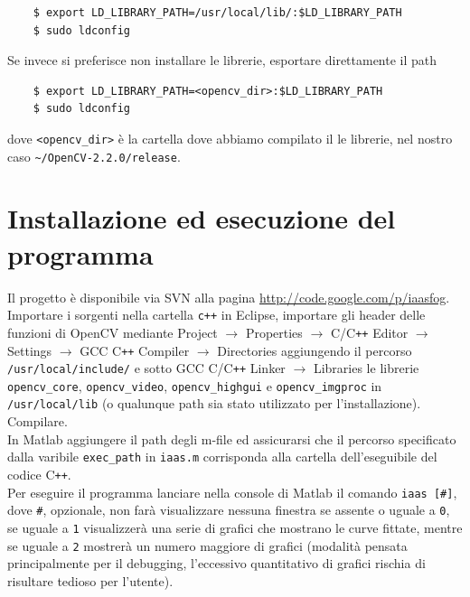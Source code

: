 \documentclass[12pt]{report}
\begin{document}
\begin{verbatim}
	$ export LD_LIBRARY_PATH=/usr/local/lib/:$LD_LIBRARY_PATH
	$ sudo ldconfig
\end{verbatim}

\noindent Se invece si preferisce non installare le librerie, esportare direttamente il path 

\begin{verbatim}
	$ export LD_LIBRARY_PATH=<opencv_dir>:$LD_LIBRARY_PATH
	$ sudo ldconfig
\end{verbatim}

\noindent dove \verb|<opencv_dir>| \`e la cartella dove abbiamo compilato il le librerie, nel nostro caso \verb|~/OpenCV-2.2.0/release|.

\section{Installazione ed esecuzione del programma}
\noindent Il progetto \`e disponibile via SVN alla pagina \url{http://code.google.com/p/iaasfog}.\\
Importare i sorgenti nella cartella \verb|c++| in Eclipse, importare gli header delle funzioni di OpenCV mediante Project $\rightarrow$ Properties  $\rightarrow$ C\slash C\verb|++| Editor $\rightarrow$ Settings $\rightarrow$ GCC C\verb|++| Compiler $\rightarrow$ Directories aggiungendo il percorso \verb|/usr/local/include/| e sotto GCC C\slash C\verb|++| Linker $\rightarrow$ Libraries le librerie \verb|opencv_core|, \verb|opencv_video|, \verb|opencv_highgui| e \verb|opencv_imgproc| in \verb|/usr/local/lib| (o qualunque path sia stato utilizzato per l'installazione).\\
Compilare.\\

\noindent In Matlab aggiungere il path degli m-file ed assicurarsi che il percorso specificato dalla varibile \verb|exec_path| in \verb|iaas.m| corrisponda alla cartella dell'eseguibile del codice C\verb|++|.\\
Per eseguire il programma lanciare nella console di Matlab il comando \verb|iaas [#]|, dove \verb|#|, opzionale, non far\`a visualizzare nessuna finestra se assente o uguale a \verb|0|, se uguale a \verb|1| visualizzer\`a una serie di grafici che mostrano le curve fittate, mentre se uguale a \verb|2| mostrer\`a un numero maggiore di grafici (modalit\`a pensata principalmente per il debugging, l'eccessivo quantitativo di grafici rischia di risultare tedioso per l'utente).

\printbibliography
\end{document}
